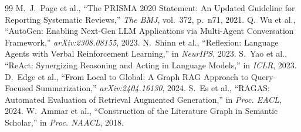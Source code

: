 \documentclass[11pt,a4paper]{article}
\begin{document}
\begin{thebibliography}{99}
 M.~J.~Page et al., ``The PRISMA 2020 Statement: An Updated Guideline for Reporting Systematic Reviews,'' \emph{The BMJ}, vol.~372, p.~n71, 2021.
 Q.~Wu et al., ``AutoGen: Enabling Next-Gen LLM Applications via Multi-Agent Conversation Framework,'' \emph{arXiv:2308.08155}, 2023.
 N.~Shinn et al., ``Reflexion: Language Agents with Verbal Reinforcement Learning,'' in \emph{NeurIPS}, 2023.
 S.~Yao et al., ``ReAct: Synergizing Reasoning and Acting in Language Models,'' in \emph{ICLR}, 2023.
 D.~Edge et al., ``From Local to Global: A Graph RAG Approach to Query-Focused Summarization,'' \emph{arXiv:2404.16130}, 2024.
 S.~Es et al., ``RAGAS: Automated Evaluation of Retrieval Augmented Generation,'' in \emph{Proc. EACL}, 2024.
 W.~Ammar et al., ``Construction of the Literature Graph in Semantic Scholar,'' in \emph{Proc. NAACL}, 2018.
\end{thebibliography}
\end{document}
